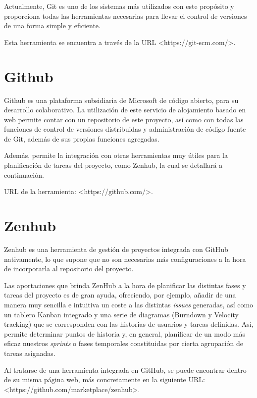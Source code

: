 Actualmente, Git es uno de los sistemas más utilizados con este propósito y proporciona todas las herramientas necesarias para llevar el
control de versiones de una forma simple y eficiente.

Esta herramienta se encuentra a través de la URL <https://git-scm.com/>.


\section{Github}

Github es una plataforma subsidiaria de Microsoft de código abierto, para su desarrollo colaborativo. La utilización de este servicio de alojamiento basado en web permite contar con un repositorio de este proyecto, así como con todas las funciones de control de versiones distribuidas y administración de código fuente de Git, además de sus propias funciones agregadas. \cite{wiki:github}

Además, permite la integración con otras herramientas muy útiles para la planificación de tareas del proyecto, como Zenhub, la cual se detallará a continuación.

URL de la herramienta: <https://github.com/>.


\section{Zenhub}

Zenhub es una herramienta de gestión de proyectos integrada con GitHub nativamente, lo que supone que no son necesarias más configuraciones a la hora de incorporarla al repositorio del proyecto.

Las aportaciones que brinda ZenHub a la hora de planificar las distintas fases y tareas del proyecto es de gran ayuda, ofreciendo, por ejemplo, añadir de una manera muy sencilla e intuitiva un coste a las distintas \textit{issues} generadas, así como un tablero Kanban integrado y una serie de diagramas (Burndown y Velocity tracking) que se corresponden con las historias de usuarios y tareas definidas. Así, permite determinar puntos de historia y, en general, planificar de un modo más eficaz nuestros \textit{sprints} o fases temporales constituidas por cierta agrupación de tareas asignadas.

Al tratarse de una herramienta integrada en GitHub, se puede encontrar dentro de su misma página web, más concretamente en la siguiente URL: <https://github.com/marketplace/zenhub>.


